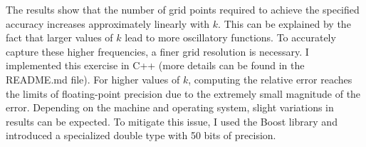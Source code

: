 The results show that the number of grid points required to achieve the specified accuracy increases approximately linearly with $k$. This can be explained by the fact that larger values of $k$ lead to more oscillatory functions. To accurately capture these higher frequencies, a finer grid resolution is necessary.\newline
\newline
I implemented this exercise in C++ (more details can be found in the README.md file). For higher values of $k$, computing the relative error reaches the limits of floating-point precision due to the extremely small magnitude of the error. Depending on the machine and operating system, slight variations in results can be expected. To mitigate this issue, I used the Boost library and introduced a specialized double type with 50 bits of precision.
